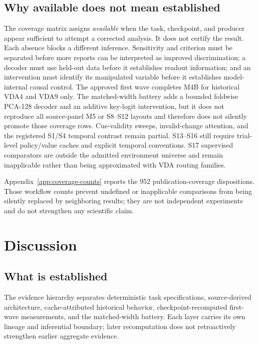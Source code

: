 \documentclass[11pt,a4paper]{article}
\begin{document}
\subsection{Why available does not mean established}
The coverage matrix assigns \emph{available} when the task, checkpoint, and producer appear sufficient to attempt a corrected analysis. It does not certify the result. Each absence blocks a different inference. Sensitivity and criterion must be separated before more reports can be interpreted as improved discrimination; a decoder must use held-out data before it establishes readout information; and an intervention must identify its manipulated variable before it establishes model-internal causal control. The approved first wave completes M4B for historical VDA4 and VDA9 only. The matched-width battery adds a bounded foldwise PCA-128 decoder and an additive key-logit intervention, but it does not reproduce all source-panel M5 or S8--S12 layouts and therefore does not silently promote those coverage rows. Cue-validity sweeps, invalid-change attention, and the registered S1/S4 temporal contrast remain partial. S13--S16 still require trial-level policy/value caches and explicit temporal conventions. S17 supervised comparators are outside the admitted environment universe and remain inapplicable rather than being approximated with VDA routing families.

Appendix~\ref{app:coverage-counts} reports the 952 publication-coverage dispositions. Those workflow counts prevent undefined or inapplicable comparisons from being silently replaced by neighboring results; they are not independent experiments and do not strengthen any scientific claim.

\section{Discussion}
\subsection{What is established}
The evidence hierarchy separates deterministic task specifications, source-derived architecture, cache-attributed historical behavior, checkpoint-recomputed first-wave measurements, and the matched-width battery. Each layer carries its own lineage and inferential boundary; later recomputation does not retroactively strengthen earlier aggregate evidence.
\end{document}
